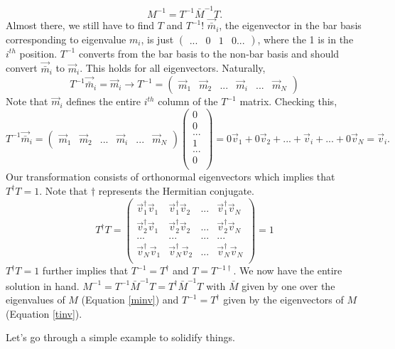 \documentclass[12pt]{article}
\begin{document}
\begin{equation}
M^{-1} = T^{-1}\bar{M}^{-1}T.   
\end{equation}
Almost there, we still have to find $T$ and $T^{-1}$! $\vec{\bar{m}}_{i}$, the eigenvector in the bar basis corresponding to eigenvalue $m_i$, is just $\begin{pmatrix}... & 0 & 1 & 0 ... \end{pmatrix}$, where the 1 is in the $i^{th}$ position. $T^{-1}$ converts from the bar basis to the non-bar basis and should convert $\vec{\bar{m}}_{i}$ to $\vec{m}_{i}$. This holds for all eigenvectors. Naturally,
\begin{equation}
\label{tinv}
T^{-1}\vec{\bar{m}}_{i} = \vec{m}_{i} \rightarrow T^{-1} = 
\left( \begin{array}{c|c|c|c|c|c}
   \vec{m}_1 & \vec{m}_2 & ... & \vec{m}_i & ... & \vec{m}_N 
\end{array}\right)
\end{equation} 
Note that $\vec{m}_i$ defines the entire $i^{th}$ column of the $T^{-1}$ matrix. Checking this,
\begin{equation}
T^{-1}\vec{\bar{m}}_{i} = 
\left( \begin{array}{c|c|c|c|c|c}
   \vec{m}_1 & \vec{m}_2 & ... & \vec{m}_i & ... & \vec{m}_N 
\end{array}\right)
\begin{pmatrix}
0 \\ 0 \\ ... \\ 1 \\ ... \\ 0 \\ 
\end{pmatrix}
= 0\vec{v}_{1} + 0 \vec{v}_{2} + ... + \vec{v}_{i} + ... + 0\vec{v}_{N} = \vec{v}_{i}.
\end{equation} 
Our transformation consists of orthonormal eigenvectors which implies that $T^{\dagger}T = 1$. Note that $\dagger$ represents the Hermitian conjugate. 
\begin{equation}
T^{\dagger}T =  
\begin{pmatrix}
\vec{v}_1^\dagger \vec{v}_1 & \vec{v}_1^\dagger \vec{v}_2 & ... & \vec{v}_1^\dagger \vec{v}_N \\
\vec{v}_2^\dagger \vec{v}_1 & \vec{v}_2^\dagger \vec{v}_2 & ... & \vec{v}_2^\dagger \vec{v}_N \\
... & ... & ... & ... \\
\vec{v}_N^\dagger \vec{v}_1 & \vec{v}_N^\dagger \vec{v}_2 & ... & \vec{v}_N^\dagger \vec{v}_N \\
\end{pmatrix}
= 1
\end{equation}
$T^{\dagger}T = 1$ further implies that $T^{-1} = T^{\dagger}$ and $T = T^{-1\dagger}$. We now have the entire solution in hand. $M^{-1} = T^{-1}\bar{M}^{-1}T = T^{\dagger}\bar{M}^{-1}T$ with $\bar{M}$ given by one over the eigenvalues of $M$ (Equation \ref{minv}) and $T^{-1} = T^\dagger$ given by the eigenvectors of $M$ (Equation \ref{tinv}).

Let's go through a simple example to solidify things. 
\end{document}
